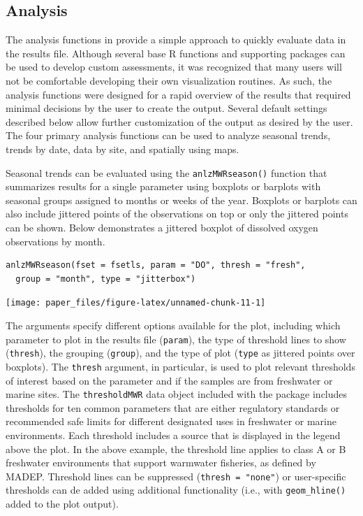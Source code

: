 \hypertarget{analysis}{%
\subsection{Analysis}\label{analysis}}

The analysis functions in  provide a simple approach to quickly evaluate data in the results file. Although several base R functions and supporting packages can be used to develop custom assessments, it was recognized that many users will not be comfortable developing their own visualization routines. As such, the analysis functions were designed for a rapid overview of the results that required minimal decisions by the user to create the output. Several default settings described below allow further customization of the output as desired by the user. The four primary analysis functions can be used to analyze seasonal trends, trends by date, data by site, and spatially using maps.

Seasonal trends can be evaluated using the \texttt{anlzMWRseason()} function that summarizes results for a single parameter using boxplots or barplots with seasonal groups assigned to months or weeks of the year. Boxplots or barplots can also include jittered points of the observations on top or only the jittered points can be shown. Below demonstrates a jittered boxplot of dissolved oxygen observations by month.

\begin{verbatim}
anlzMWRseason(fset = fsetls, param = "DO", thresh = "fresh", 
  group = "month", type = "jitterbox")
\end{verbatim}

\begin{center}\texttt{[image: paper\_files/figure-latex/unnamed-chunk-11-1]} \end{center}

The arguments specify different options available for the plot, including which parameter to plot in the results file (\texttt{param}), the type of threshold lines to show (\texttt{thresh}), the grouping (\texttt{group}), and the type of plot (\texttt{type} as jittered points over boxplots). The \texttt{thresh} argument, in particular, is used to plot relevant thresholds of interest based on the parameter and if the samples are from freshwater or marine sites. The \texttt{thresholdMWR} data object included with the package includes thresholds for ten common parameters that are either regulatory standards or recommended safe limits for different designated uses in freshwater or marine environments. Each threshold includes a source that is displayed in the legend above the plot. In the above example, the threshold line applies to class A or B freshwater environments that support warmwater fisheries, as defined by MADEP. Threshold lines can be suppressed (\texttt{thresh\ =\ "none"}) or user-specific thresholds can de added using additional  functionality (i.e., with \texttt{geom\_hline()} added to the plot output).

